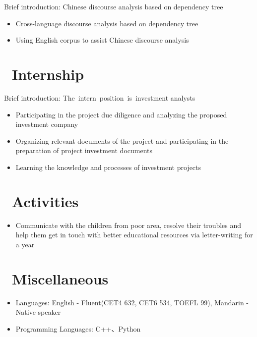 \documentclass{resume}
\begin{document}
Brief introduction: Chinese discourse analysis based on dependency tree
\begin{itemize}
  \item Cross-language discourse analysis based on dependency tree
  \item Using English corpus to assist Chinese discourse analysis
\end{itemize}


\section{\faCogs\ Internship}
Brief introduction: The intern position is investment analysts
\begin{itemize}
  \item Participating in the project due diligence and analyzing the proposed investment company
  \item Organizing relevant documents of the project and participating in the preparation of project investment documents
  \item Learning the knowledge and processes of investment projects
\end{itemize}

\section{\faHeartO\ Activities}
\begin{itemize}
  \item Communicate with the children from poor area, resolve their troubles and help them get in touch with better educational resources via letter-writing for a year
\end{itemize}

\section{\faInfo\ Miscellaneous}
\begin{itemize}[parsep=0.5ex]
  \item Languages: English - Fluent(CET4 632, CET6 534, TOEFL 99), Mandarin - Native speaker
  \item Programming Languages: C++、Python
\end{itemize}

%
%
\end{document}
